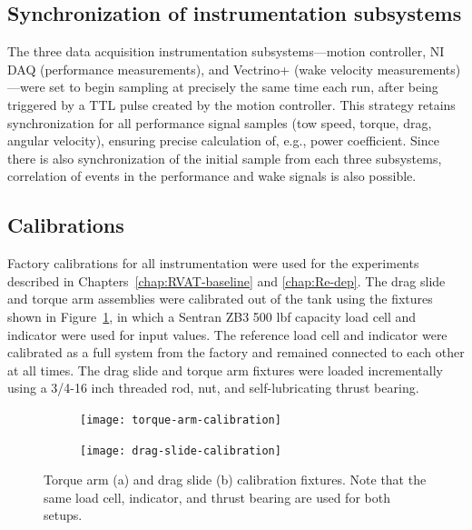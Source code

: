 \subsection{Synchronization of instrumentation subsystems}

The three data acquisition instrumentation subsystems---motion controller, NI
DAQ (performance measurements), and Vectrino+ (wake velocity
measurements)---were set to begin sampling at precisely the same time each run,
after being triggered by a TTL pulse created by the motion controller. This
strategy retains synchronization for all performance signal samples (tow speed,
torque, drag, angular velocity), ensuring precise calculation of, e.g., power
coefficient. Since there is also synchronization of the initial sample from each
three subsystems, correlation of events in the performance and wake signals is
also possible.


\subsection{Calibrations}

Factory calibrations for all instrumentation were used for the experiments
described in Chapters~\ref{chap:RVAT-baseline} and \ref{chap:Re-dep}. The drag
slide and torque arm assemblies were calibrated out of the tank using the
fixtures shown in Figure~\ref{fig:calibration-fixtures}, in which a Sentran ZB3
500 lbf capacity load cell and indicator were used for input values. The
reference load cell and indicator were calibrated as a full system from the
factory and remained connected to each other at all times. The drag slide and
torque arm fixtures were loaded incrementally using a 3/4-16 inch threaded rod,
nut, and self-lubricating thrust bearing.

\begin{figure}
    \centering
    \begin{subfigure}{0.9\textwidth}
        \texttt{[image: torque-arm-calibration]} \caption{}
    \end{subfigure}
    
    \begin{subfigure}{0.9\textwidth}
        \texttt{[image: drag-slide-calibration]}
        \caption{}
    \end{subfigure}
    
    \caption{Torque arm (a) and drag slide (b) calibration fixtures. Note that
        the same load cell, indicator, and thrust bearing are used for both setups.}
    
    \label{fig:calibration-fixtures}
\end{figure}

